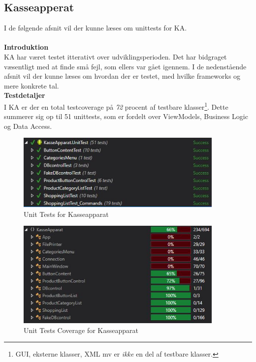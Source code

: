 \subsection{Kasseapperat}
I de følgende afsnit vil der kunne læses om unittests for \gls{KA}.\\\\

\textbf{Introduktion}\\
\gls{KA} har været testet itterativt over udviklingsperioden. Det har bidgraget væsentligt med at finde små fejl, som ellers var gået igennem. I de nedenstående afsnit vil der kunne læses om hvordan der er testet, med hvilke frameworks og mere konkrete tal.\\

\textbf{Testdetaljer}\\
I \gls{KA} er der en total testcoverage på \textit{72} procent af testbare klasser\footnote{GUI, eksterne klasser, XML mv er \textit{ikke} en del af testbare klasser.}. Dette summerer sig op til 51 unittests, som er fordelt over ViewModels, Business Logic og Data Access.

\begin{figure}[H]
	\centering
	\includegraphics[width=0.90\textwidth]{Test/Images/Frontend/UnitTests}
	\caption{Unit Tests for Kasseapparat}
	\label{fig:UTKA}
\end{figure}

\begin{figure}[H]
	\centering
	\includegraphics[width=0.90\textwidth]{Test/Images/Frontend/UnitTestCover}
	\caption{Unit Tests Coverage for Kasseapparat}
	\label{fig:UTCKA}
\end{figure}

